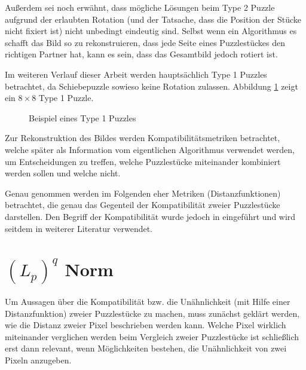 \documentclass{whswinvcbook}
\begin{document}
Außerdem sei noch erwähnt, dass mögliche Lösungen beim Type 2 Puzzle aufgrund der erlaubten Rotation (und der Tatsache, dass die Position der Stücke nicht fixiert ist) nicht unbedingt eindeutig sind. Selbst wenn ein Algorithmus es schafft das Bild so zu rekonstruieren, dass jede Seite eines Puzzlestückes den richtigen Partner hat, kann es sein, dass das Gesamtbild jedoch rotiert ist.

Im weiteren Verlauf dieser Arbeit werden hauptsächlich Type 1 Puzzles betrachtet, da Schiebepuzzle sowieso keine Rotation zulassen. Abbildung \ref{fig-jigswap} zeigt ein $8\times 8$ Type 1 Puzzle.
\begin{figure}[H]
    \centering
    \quad\quad\quad\quad
    \caption{Beispiel eines Type 1 Puzzles}
    \label{fig-jigswap}
\end{figure}
Zur Rekonstruktion des Bildes werden Kompatibilitätsmetriken betrachtet, welche später als Information vom eigentlichen Algorithmus verwendet werden, um Entscheidungen zu treffen, welche Puzzlestücke miteinander kombiniert werden sollen und welche nicht.

Genau genommen werden im Folgenden eher Metriken (Distanzfunktionen) betrachtet, die genau das Gegenteil der Kompatibilität zweier Puzzlestücke darstellen. Den Begriff der Kompatibilität wurde jedoch in \cite{pomeranz} eingeführt und wird seitdem in weiterer Literatur verwendet.
\section{$(L_p)^q$ Norm}\label{section-norm}
Um Aussagen über die Kompatibilität bzw. die Unähnlichkeit (mit Hilfe einer Distanzfunktion) zweier Puzzlestücke zu machen, muss zunächst geklärt werden, wie die Distanz zweier Pixel beschrieben werden kann. Welche Pixel wirklich miteinander verglichen werden beim Vergleich zweier Puzzlestücke ist schließlich erst dann relevant, wenn Möglichkeiten bestehen, die Unähnlichkeit von zwei Pixeln anzugeben.
\end{document}
